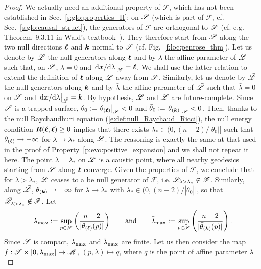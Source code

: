 \begin{proof}
We actually need an additional property of $\mathscr{F}$,
which has not been established in Sec.~\ref{s:glo:properties_H}:
on  $\mathscr{S}$ (which is part of $\mathscr{F}$, cf. Sec.~\ref{s:glo:causal_struct}),
the generators of $\mathscr{F}$ are orthogonal to $\mathscr{S}$ (cf. e.g. Theorem~9.3.11
in Wald's textbook~\cite{Wald84}). They therefore start from $\mathscr{S}$ along
the two null directions $\bm{\ell}$ and $\bm{k}$ normal to $\mathscr{S}$ (cf. Fig.~\ref{f:loc:penrose_thm}). Let us denote by $\mathscr{L}$ the null
generators along $\bm{\ell}$ and by $\lambda$ the affine parameter of $\mathscr{L}$
such that, on $\mathscr{S}$, $\lambda = 0$ and $\left. \mathrm{d}\bm{x}/\mathrm{d}\lambda\right| _{\mathscr{L}} = \bm{\ell}$. We shall use
the latter relation to extend the definition of $\bm{\ell}$ along $\mathscr{L}$
away from $\mathscr{S}$. Similarly, let us denote by $\bar{\mathscr{L}}$ the null
generators along $\bm{k}$ and by $\bar\lambda$ the affine parameter of $\bar{\mathscr{L}}$
such that $\bar\lambda = 0$ on $\mathscr{S}$ and
$\left. \mathrm{d}\bm{x}/\mathrm{d}\bar\lambda \right| _{\bar{\mathscr{L}}}= \bm{k}$.
By hypothesis, $\mathscr{L}$ and $\bar{\mathscr{L}}$ are future-complete.
Since $\mathscr{S}$ is a trapped surface, $\theta_0 := \left. \theta_{(\bm{\ell})} \right| _{\mathscr{S}} < 0$
and $\bar\theta_0 := \left. \theta_{(\bm{k})} \right|_{\mathscr{S}}<0$.
Then, thanks to the
null Raychaudhuri equation
(\ref{e:def:null_Raychaud_Ricci}),
the null energy condition $\bm{R}(\bm{\ell},\bm{\ell}) \geq 0$ implies that there exists $\lambda_* \in (0, (n-2)/|\theta_0|]$
such that $\theta_{(\bm{\ell})} \to -\infty$ for $\lambda\to \lambda_*$ along $\mathscr{L}$.
The reasoning is exactly the same at that used in the proof of
Property~\ref{p:evo:positive_expansion} and we shall
not repeat it here. The point $\lambda=\lambda_*$ on $\mathscr{L}$ is a caustic point,
where all nearby geodesics starting from $\mathscr{S}$ along $\bm{\ell}$ converge.
Given the properties of $\mathscr{F}$, we conclude that for $\lambda > \lambda_*$, $\mathscr{L}$
ceases to a be null generator of $\mathscr{F}$, i.e.
$\mathscr{L}_{\lambda > \lambda_*} \not\in \mathscr{F}$.
Similarly, along $\bar{\mathscr{L}}$,
$\theta_{(\bm{k})} \to -\infty$ for $\bar\lambda\to \bar\lambda_*$
with $\bar\lambda_* \in (0, (n-2)/|\bar\theta_0|]$, so that
$\bar{\mathscr{L}}_{\bar\lambda > \bar\lambda_*} \not\in \mathscr{F}$.
Let
\[
    \lambda_{\rm max} := \sup_{p\in\mathscr{S}} \left(  \frac{n-2}{|\theta_{(\bm{\ell})} (p)|} \right)
    \qquad\mbox{and}\qquad
    \bar\lambda_{\rm max} := \sup_{p\in\mathscr{S}} \left(  \frac{n-2}{|\bar\theta_{(\bm{k})}(p)|} \right)    .
\]
Since $\mathscr{S}$ is compact, $\lambda_{\rm max}$ and $\bar\lambda_{\rm max}$ are finite.
Let us then consider the map $f: \mathscr{S} \times [0,\lambda_{\rm max}] \to \mathscr{M}$,
$(p,\lambda) \mapsto q$, where $q$ is the point of affine parameter $\lambda$

\end{proof}
